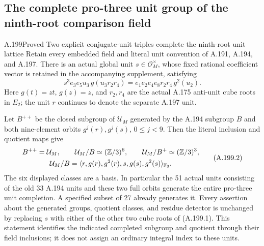 \subsection{The complete pro-three unit group of the ninth-root comparison field}

\begin{statement}{A.199}{Proved}
{Two explicit conjugate-unit triples complete the ninth-root unit lattice}
Retain every embedded field and literal unit convention of
A.191, A.194, and A.197.  There is an actual global unit
\(s\in\mathcal O_M^\times\), whose fixed rational
coefficient vector is retained in the accompanying supplement,
satisfying
\[
 s^3e_3e_5u_3\,g(u_3r_2r_4)
                  =e_1e_2e_4e_8r_2r_4\,g^2(u_2).
\tag{A.199.1}
\]
Here \(g(t)=zt\), \(g(z)=z\), and \(r_2,r_4\) are
the actual A.175 anti-unit cube roots in \(E_2\); the
unit \(r\) continues to denote the separate A.197 unit.

Let \(B^{++}\) be the closed subgroup of \(\mathcal U_M\)
generated by the A.194 subgroup \(B\) and both nine-element
orbits \(g^j(r),g^j(s)\), \(0\leq j<9\).
Then the literal inclusion and quotient maps give
\[
\begin{gathered}
 B^{++}=\mathcal U_M,\qquad
 \mathcal U_M/B\simeq(\mathbb Z/3)^6,\qquad
 \mathcal U_M/B^+\simeq(\mathbb Z/3)^3,\\
 \mathcal U_M/B
   =\langle r,g(r),g^2(r),s,g(s),g^2(s)\rangle_{\mathbb F_3}.
\end{gathered}
\tag{A.199.2}
\]
The six displayed classes are a basis.  In particular the
51 actual units consisting of the old 33 A.194 units and
these two full orbits generate the entire pro-three unit
completion.  A specified subset of 27 already generates it.
Every assertion about the generated groups, quotient classes,
and residue detector is unchanged by replacing \(s\) with
either of the other two cube roots of (A.199.1).
This statement identifies the indicated completed subgroup
and quotient through their field inclusions; it does not
assign an ordinary integral index to these units.
\end{statement}

